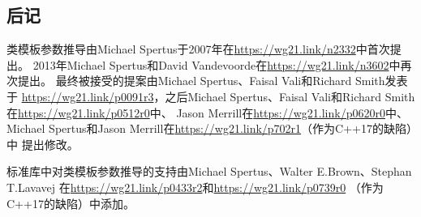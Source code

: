 \subsection{后记}
类模板参数推导由Michael Spertus于2007年在\url{https://wg21.link/n2332}中首次提出。
2013年Michael Spertus和David Vandevoorde在\url{https://wg21.link/n3602}中再次提出。
最终被接受的提案由Michael Spertus、Faisal Vali和Richard Smith发表于
\url{https://wg21.link/p0091r3}，之后Michael Spertus、Faisal Vali和Richard Smith
在\url{https://wg21.link/p0512r0}中、
Jason Merrill在\url{https://wg21.link/p0620r0}中、
Michael Spertus和Jason Merrill在\url{https://wg21.link/p702r1}（作为C++17的缺陷）中
提出修改。

标准库中对类模板参数推导的支持由Michael Spertus、Walter E.Brown、Stephan T.Lavavej
在\url{https://wg21.link/p0433r2}和\url{https://wg21.link/p0739r0}
（作为C++17的缺陷）中添加。